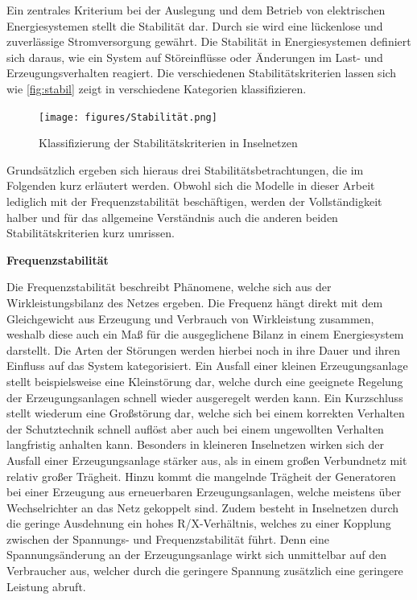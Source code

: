 Ein zentrales Kriterium bei der Auslegung und dem Betrieb von elektrischen Energiesystemen stellt die Stabilität dar. Durch sie wird eine lückenlose und zuverlässige Stromversorgung gewährt. Die Stabilität in Energiesystemen definiert sich daraus, wie ein System auf Störeinflüsse oder Änderungen im Last- und Erzeugungsverhalten reagiert. Die verschiedenen Stabilitätskriterien lassen sich wie  \autoref{fig:stabil} zeigt in verschiedene Kategorien klassifizieren. 

\begin{figure}[H]
	\centering
	\texttt{[image: figures/Stabilität.png]}
	\caption{Klassifizierung der Stabilitätskriterien in Inselnetzen \cite{Willenberg2021}}
	\label{fig:stabil}
\end{figure}

Grundsätzlich ergeben sich hieraus drei Stabilitätsbetrachtungen, die im Folgenden kurz erläutert werden. Obwohl sich die Modelle in dieser Arbeit lediglich mit der Frequenzstabilität beschäftigen, werden der Vollständigkeit halber und für das allgemeine Verständnis auch die anderen beiden Stabilitätskriterien kurz umrissen.

\textbf{Frequenzstabilität}

Die Frequenzstabilität beschreibt Phänomene, welche sich aus der Wirkleistungsbilanz des Netzes ergeben. Die Frequenz hängt direkt mit dem Gleichgewicht aus Erzeugung und Verbrauch von Wirkleistung zusammen, weshalb diese auch ein Maß für die ausgeglichene Bilanz in einem Energiesystem darstellt. Die Arten der Störungen werden hierbei noch in ihre Dauer und ihren Einfluss auf das System kategorisiert. Ein Ausfall einer kleinen Erzeugungsanlage stellt beispielsweise eine Kleinstörung dar, welche durch eine geeignete Regelung der Erzeugungsanlagen schnell wieder ausgeregelt werden kann. Ein Kurzschluss stellt wiederum eine Großstörung dar, welche sich bei einem korrekten Verhalten der Schutztechnik schnell auflöst aber auch bei einem ungewollten Verhalten langfristig anhalten kann. Besonders in kleineren Inselnetzen wirken sich der Ausfall einer Erzeugungsanlage stärker aus, als in einem großen Verbundnetz mit relativ großer Trägheit. Hinzu kommt die mangelnde Trägheit der Generatoren bei einer Erzeugung aus erneuerbaren Erzeugungsanlagen, welche meistens über Wechselrichter an das Netz gekoppelt sind. \cite{Simulationsmethode} Zudem besteht in Inselnetzen durch die geringe Ausdehnung ein hohes R/X-Verhältnis, welches zu einer Kopplung zwischen der Spannungs- und Frequenzstabilität führt. Denn eine Spannungsänderung an der Erzeugungsanlage wirkt sich unmittelbar auf den Verbraucher aus, welcher durch die geringere Spannung zusätzlich eine geringere Leistung abruft. \cite{Willenberg2021}

